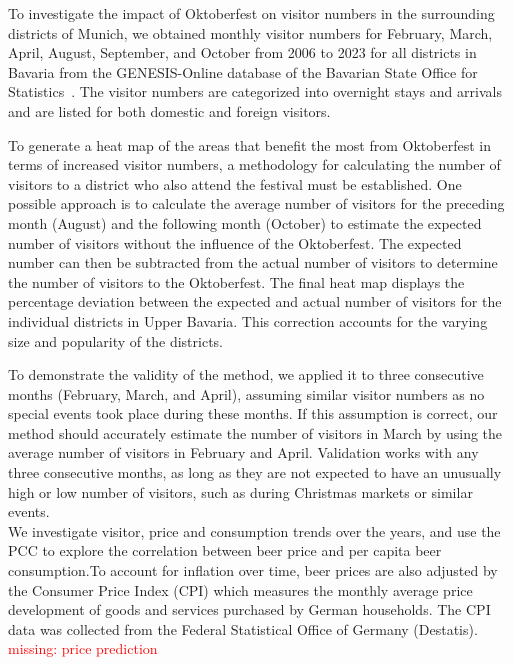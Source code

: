\documentclass{article}
\theoremstyle{plain}
\theoremstyle{definition}
\theoremstyle{remark}
\begin{document}
To investigate the impact of Oktoberfest on visitor numbers in the surrounding districts of Munich, we obtained monthly visitor numbers for February, March, April, August, September, and October from 2006 to 2023 for all districts in Bavaria from the GENESIS-Online database of the Bavarian State Office for Statistics~\citep{table_GENESIS}. The visitor numbers are categorized into overnight stays and arrivals and are listed for both domestic and foreign visitors.

To generate a heat map of the areas that benefit the most from Oktoberfest in terms of increased visitor numbers, a methodology for calculating the number of visitors to a district who also attend the festival must be established. One possible approach is to calculate the average number of visitors for the preceding month (August) and the following month (October) to estimate the expected number of visitors without the influence of the Oktoberfest. The expected number can then be subtracted from the actual number of visitors to determine the number of visitors to the Oktoberfest. The final heat map displays the percentage deviation between the expected and actual number of visitors for the individual districts in Upper Bavaria. This correction accounts for the varying size and popularity of the districts.

To demonstrate the validity of the method, we applied it to three consecutive months (February, March, and April), assuming similar visitor numbers as no special events took place during these months. If this assumption is correct, our method should accurately estimate the number of visitors in March by using the average number of visitors in February and April. Validation works with any three consecutive months, as long as they are not expected to have an unusually high or low number of visitors, such as during Christmas markets or similar events.\\

We investigate visitor, price and consumption trends over the years, and use the PCC to explore the correlation between beer price and per capita beer consumption.To account for inflation over time, beer prices are also adjusted by the Consumer Price Index (CPI) which measures the monthly average price development of goods and services purchased by German households. The CPI data was collected from the Federal Statistical Office of Germany (Destatis).\\
\textcolor{red}{missing: price prediction}\\
\end{document}
